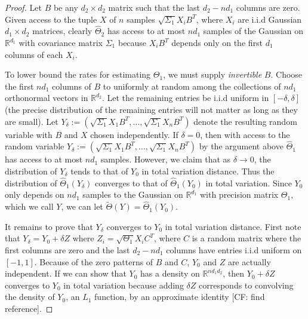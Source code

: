 \documentclass[aos]{imsart}
\theoremstyle{definition}
\numberwithin{equation}{section}
\newcommand{\R}{{\mathbb{R}}}
\newcommand{\CF}[1]{{\color{purple}[CF: #1]}}
\begin{document}
\begin{proof}

Let $B$ be any $d_2\times d_2$ matrix such that the last $d_2 - nd_1$ columns are zero. Given access to the tuple $X$ of $n$ samples $\sqrt{\Sigma_1} X_i B^T$, where $X_i$ are i.i.d Gaussian $d_1\times d_2$ matrices, clearly $\widehat{\Theta}_2$ has access to at most $n d_1$ samples of the Gaussian on $\R^{d_1}$ with covariance matrix $\Sigma_1$ because $X_i B^T$ depends only on the first $d_1$ columns of each $X_i$.

To lower bound the rates for estimating $\Theta_1$, we must supply \emph{invertible} $B$. Choose the first $nd_1$ columns of $B$ to uniformly at random among the collections of $nd_1$ orthonormal vectors in $\R^{d_2}$. Let the remaining entries be i.i.d uniform in $[-\delta, \delta]$ (the precise distribution of the remaining entries will not matter as long as they are small). Let $Y_\delta:=(\sqrt{\Sigma_1} X_1 B^T, \dots, \sqrt{\Sigma_1} X_n B^T)$ denote the resulting random variable with $B$ and $X$ chosen independently. If $\delta = 0$, then with access to the random variable $Y_\delta:=(\sqrt{\Sigma_1} X_1 B^T, \dots, \sqrt{\Sigma_1} X_n B^T)$ by the argument above $\widehat{\Theta}_1$ has access to at most $nd_1$ samples. However, we claim that as $\delta \to 0$, the distribution of $Y_\delta$ tends to that of $Y_0$ in total variation distance. Thus the distribution of $\widehat{\Theta}_1(Y_\delta)$ converges to that of $\widehat{\Theta}_1(Y_0)$ in total variation. Since $Y_0$ only depends on $nd_1$ samples to the Gaussian on $\R^{d_1}$ with precision matrix $\Theta_1$, which we call $Y$, we can let $\tilde{\Theta}(Y) = \widehat{\Theta}_1(Y_0)$.

It remains to prove that $Y_\delta$ converges to $Y_0$ in total variation distance. First note that $Y_\delta = Y_0 + \delta Z$ where $Z_i = \sqrt{\Theta_1} X_i C^T$, where $C$ is a random matrix where the first columns are zero and the last $d_2 - n d_1$ columns have entries i.i.d uniform on $[-1, 1]$. Because of the zero patterns of $B$ and $C$, $Y_0$ and $Z$ are actually independent. If we can show that $Y_0$ has a density on $\R^{nd_1d_2}$, then $Y_0 + \delta Z$ converges to $Y_0$ in total variation because adding $\delta Z$ corresponds to convolving the density of $Y_0$, an $L_1$ function, by an approximate identity \CF{find reference}.


\end{proof}
\end{document}
